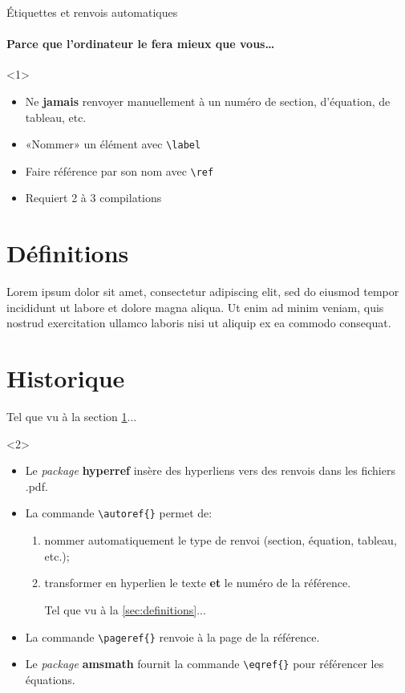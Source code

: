 \begin{frame}[fragile]{Étiquettes et renvois automatiques}
	\framesubtitle{Parce que l'ordinateur le fera mieux que vous\ldots}
	\begin{onlyenv}
		\begin{itemize}
			\item Ne \textbf{jamais} renvoyer manuellement à un numéro de section, d’équation, de tableau, etc.
			\item «Nommer» un élément avec \lstinline|\label|
			\item Faire référence par son nom avec \lstinline|\ref|
			\item Requiert 2 à 3 compilations
		\end{itemize}
	
\begin{codesource}
	\section{Définitions}
		\label{sec:definitions}
	
		Lorem ipsum dolor sit amet, consectetur adipiscing elit, 
		sed do eiusmod tempor incididunt ut labore et dolore magna aliqua. 
		Ut enim ad minim veniam, quis nostrud exercitation ullamco laboris 
		nisi ut aliquip ex ea commodo consequat.
	
	\section{Historique}
		Tel que vu à la section \ref{sec:definitions}...
\end{codesource}
	\end{onlyenv}
	\begin{onlyenv}
		\begin{itemize}
			\item Le \emph{package} \textbf{hyperref} insère des hyperliens vers des renvois dans les fichiers .pdf.
			\item La commande \lstinline|\autoref{}| permet de:
				\begin{enumerate}
					\item nommer automatiquement le type de renvoi (section, équation, tableau, etc.);
					\item transformer en hyperlien le texte \textbf{et} le numéro de la référence.
\begin{codesource}
	Tel que vu à la \autoref{sec:definitions}...
\end{codesource}
				\end{enumerate}
			\item La commande \lstinline|\pageref{}| renvoie à la page de la référence.
			\item Le \emph{package} \textbf{amsmath} fournit la commande \lstinline|\eqref{}| pour
				référencer les équations.
		\end{itemize}
	\end{onlyenv}
\end{frame}